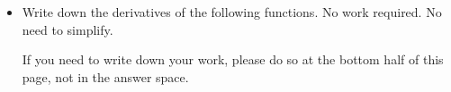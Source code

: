 \documentclass[11pt]{article}
\begin{document}
\begin{itemize}
\begin{enumerate}
\begin{minipage}[t][1.5in]{0.2\textwidth}
\begin{itemize}
                        \item[B.] $\dfrac{dT}{dt}\bigg|_{t=3}<0$
                            \vfill

                        \item[C.] $\dfrac{dT}{dt}\bigg|_{t=3}>0$
                            \vfill

                    \end{itemize}
                \end{minipage}
                \hfill
                \begin{minipage}[t][1.5in]{0.2\textwidth}
                    \begin{itemize}
                        \item[D.] $T'(10)<0$
                            \vfill

                        \item[E.] $T'(10)>0$
                            \vfill

                        \item[F.] $T'(10)=0$
                            \vfill

                    \end{itemize}
                \end{minipage}        

        \end{enumerate}
        \pagebreak
    \item[\textbf{D2.}] Write down the derivatives of the following functions. No work required. No need to simplify.

        If you need to write down your work, please do so at the bottom half of this page, not in the answer space.


\end{itemize}
\end{document}
